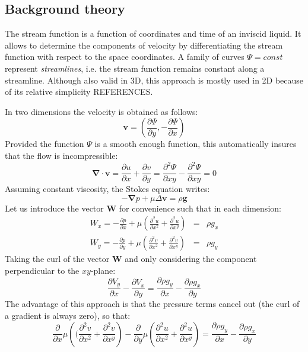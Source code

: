 \subsection{Background theory}
The stream function is a function of coordinates and time of an inviscid liquid.
It allows to determine the components of velocity by differentiating the stream function 
with respect to the space coordinates. 
A family of curves $\Psi = const$ represent {\it streamlines}, i.e. 
the stream function remains constant along a streamline. 
Although also valid in 3D, this approach is mostly used in 2D because of its 
relative simplicity {\color{red} REFERENCES}.

In two dimensions the velocity is obtained as follows:
\begin{equation}
{\bm v} = \left( \frac{\partial \Psi}{\partial y},-\frac{\partial \Psi}{\partial x} \right) 
\end{equation}
Provided the function $\Psi$ is a smooth enough function, 
this automatically insures that the flow is incompressible:
\begin{equation}
{\bm \nabla}\cdot {\bm v} = 
\frac{\partial u}{\partial x} + \frac{\partial v}{\partial y}
=
\frac{\partial^2 \Psi}{\partial xy} - \frac{\partial^2 \Psi}{\partial xy} =0 
\end{equation}
Assuming constant viscosity, the Stokes equation writes:
\begin{equation}
-{\bm \nabla}p + \mu \Delta {\bm v} = \rho {\bm g}
\end{equation}
Let us introduce the vector ${\bm W}$ for convenience such that in each dimension:
\begin{eqnarray}
W_x=-\frac{\partial p}{\partial x} 
+ \mu\left( \frac{\partial^2 u}{\partial x^2} + \frac{\partial^2 u}{\partial x^y} \right)&=& \rho g_x  \\
W_y=-\frac{\partial p}{\partial y} 
+ \mu \left(\frac{\partial^2 v}{\partial x^2} + \frac{\partial^2 v}{\partial x^y} \right) &=& \rho g_y  
\end{eqnarray}
Taking the curl of the vector ${\bm W}$ and only considering the component perpendicular to the $xy$-plane:
\begin{equation}
\frac{\partial V_y}{\partial x} - \frac{\partial V_x}{\partial y}  = 
\frac{\partial \rho g_y}{\partial x} - \frac{\partial \rho g_x}{\partial y}   
\end{equation}
The advantage of this approach is that the pressure terms cancel out (the curl of a gradient is always zero), 
so that:
\begin{equation}
\frac{\partial}{\partial x}\mu\left(( \frac{\partial^2 v}{\partial x^2} + \frac{\partial^2 v}{\partial x^y}  \right) 
- \frac{\partial }{\partial y} \mu \left( \frac{\partial^2 u}{\partial x^2} + \frac{\partial^2 u}{\partial x^y} \right) = 
\frac{\partial \rho g_y}{\partial x} - \frac{\partial \rho g_x}{\partial y}   
\end{equation}
